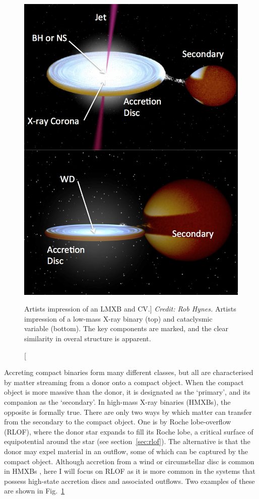 \begin{figure}
\centering
\includegraphics[width=1.0\textwidth]{figures/01-intro/cv_and_xrb.png}
\caption
[Artists impression of an LMXB and CV.]
{
{\sl Credit: Rob Hynes.} 
Artists impression of a low-mass X-ray binary (top) and
cataclysmic variable (bottom). The key components are marked,
and the clear similarity in overal structure is apparent.
} 
\label{fig:cv_and_xrb}
\end{figure}

Accreting compact binaries form many different classes, 
but all are characterised by matter streaming from a donor
onto a compact object. When the compact object is more massive 
than the donor, it is designated as the `primary', 
and its companion as the `secondary'. 
In high-mass X-ray binaries (HMXBs), the opposite is formally true.
There are only two ways by which matter can transfer 
from the secondary to the compact object. One is by Roche lobe-overflow (RLOF),
where the donor star expands to fill its Roche lobe, a critical surface
of equipotential around the star (see section~\ref{sec:rlof}). 
The alternative is that the donor may expel
material in an outflow, some of which can be captured by the compact object. 
Although accretion from a wind or circumstellar disc is common in 
HMXBs \citep{bartlett2013}, here I will focus on 
RLOF as it is more common in the systems that possess high-state accretion discs
and associated outflows. Two examples of these are shown in Fig.~\ref{fig:cv_and_xrb}


